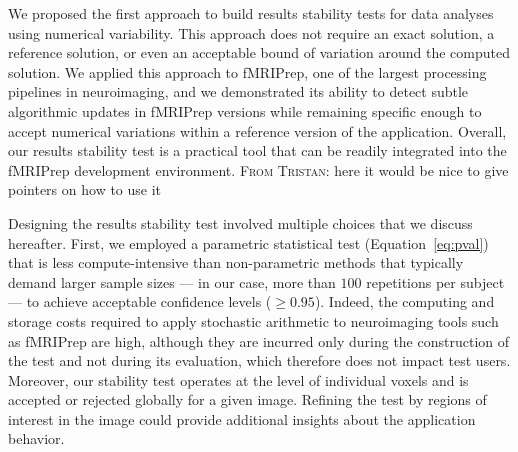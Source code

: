 \documentclass[lettersize,journal]{IEEEtran}
\newcommand{\TG}[1]{\color{orange}\textsc{From Tristan:} #1\color{black}\xspace}
\newcommand{\fmriprep}{fMRIPrep\xspace}
\begin{document}

We proposed the first approach to build results stability tests for data analyses using numerical variability. This approach does not require an exact solution, a reference solution, or even an acceptable bound of variation around the computed solution. We applied this approach to \fmriprep, one of the largest processing pipelines in neuroimaging, and we demonstrated its ability to detect subtle algorithmic updates in \fmriprep versions while remaining specific enough to accept numerical variations within a reference version of the application. Overall, our results stability test is a practical tool that can be readily integrated into the \fmriprep development environment. \TG{here it would be nice to give pointers on how to use it}

Designing the results stability test involved multiple choices that we discuss hereafter.
First, we employed a parametric statistical test (Equation~\ref{eq:pval}) that is less compute-intensive than non-parametric methods that typically demand larger sample sizes --- in our case, more than $100$ repetitions per subject --- to achieve acceptable confidence levels ($\geq 0.95$).
Indeed, the computing and storage costs required to apply stochastic arithmetic to neuroimaging tools such as \fmriprep are high, although they are incurred only during the construction of the test 
and not during its evaluation, which therefore does not impact test users. Moreover, our stability test operates at the level of individual voxels and is accepted or rejected globally for a given image. Refining the test by regions of interest in the image could provide additional insights about the application behavior.
\end{document}
